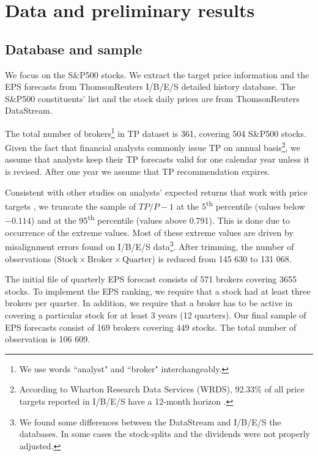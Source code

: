 \documentclass{book}
\begin{document}
\section{Data and preliminary results}
\label{sec:rankings}

\subsection{Database and sample}
We focus on the  S\&P500 stocks. We extract the target price information and the EPS forecasts from ThomsonReuters  I/B/E/S detailed history database. The  S\&P500 constituents' list and the stock daily prices are from ThomsonReuters DataStream.


The total number of brokers\footnote{We use words ``analyst" and ``broker" interchangeably.} in TP dataset is 361, covering 504 S\&P500 stocks. Given the fact that financial analysts commonly issue TP on annual basis\footnote{According to Wharton Research Data Services (WRDS), 92.33\% of all price targets reported in I/B/E/S have a 12-month horizon \citep{glushkov2009}.}, we assume that analysts keep their TP forecasts valid for one calendar year unless it is revised. After one year we assume that TP recommendation expires.

Consistent with other studies on analysts' expected returns that work with price targets  \citep{bradshaw2002,brav2003,da2011}, we truncate the sample of $TP/P-1$ at the 5\textsuperscript{th} percentile (values below \ensuremath{-0.114}) and at the 95\textsuperscript{th} percentile (values above 0.791). This is done due to occurrence of the extreme values. Most of these extreme values are driven by misalignment errors found on I/B/E/S data\footnote{We found some differences between the  DataStream and I/B/E/S the databases. In some cases the stock-splits and the dividends were not properly adjusted.}. After trimming, the number of observations ($\mathrm{Stock} \times \mathrm{Broker} \times  \mathrm{Quarter}$) is reduced  from 145 630 to 131 068.

The initial file of quarterly EPS forecast consists of  571 brokers covering 3655 stocks. To implement the EPS ranking, we require that a stock had at least three brokers per quarter. In addition, we require that a broker has to be active in covering a particular stock for at least 3 years (12 quarters). Our final sample of EPS forecasts consist of  169 brokers covering 449 stocks. The total number of observation is 106 609.
 
\end{document}
